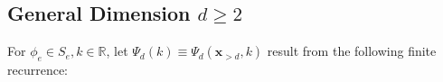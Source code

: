 \documentclass[11pt,A4,twoside]{article}
\newcommand\ind{\mathbf{1}}
\numberwithin{equation}{section}
\newcommand{\RED}[1]{{\color{red}#1}}
\renewcommand{\r}[1]{\RED{#1}}
\newcommand{\F}{\mathcal{F}}
\renewcommand*\d{\mathop{}\!\mathrm{d}}
\newcommand{\norml}[1]{\left\Vert#1 \right\Vert_{1}}
\newcommand{\inner}[1]{\left\langle#1 \right\rangle}
\newcommand{\x}{\mathbf{x}}
\newcommand{\R}{\mathbbm{R}}
\def\qq{\;\;\;\;\;\;}
\newcommand{\beqa}{\begin{eqnarray}}
\newcommand{\eeqa}{\end{eqnarray}}
\def\bal{\begin{aligned}}
\def\eal{\end{aligned}}
\def\bll#1{
\beqa\label{#1}\bal
}\def\lel{\eal\eeqa}
\newcommand{\beql}[1]{\bll{#1}}
\newcommand{\eeql}{\lel}
\theoremstyle{definition}
\theoremstyle{remark}
\def\R{\mathbb{R}}
\def\phie{\phi_e}
\begin{document}
{{\subsection{General Dimension $d\geq 2$\label{a:disp-general-dim}} 


{\def\jmath{i}
For $ \phi_e\in S_e, k\in\R$, let $\Psi_d(k) \equiv \Psi_d(\x_{>d},k) $ result from the following finite recurrence: 

}}}
\end{document}
